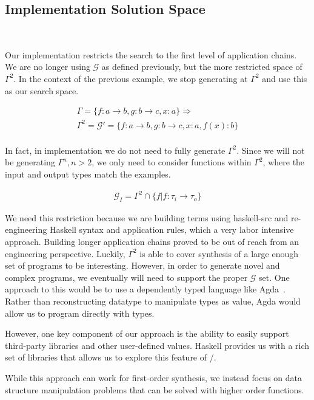 \subsection{Implementation Solution Space}\label{solnSpace}\

Our implementation restricts the search to the first level of application chains.
We are no longer using $\mathcal{G}$ as defined previously, but the more restricted space of $\Gamma^2$.
In the context of the previous example, we stop generating at $\Gamma^2$ and use this as our search space.

\begin{gather*}
\Gamma = \{f:a\to b, g:b\to c, x:a\} \Rightarrow \\
\Gamma^2 = \mathcal{G}' = \{f:a\to b, g:b\to c, x:a, f(x):b\}\\
\end{gather*}

In fact, in implementation we do not need to fully generate $\Gamma^2$.
Since we will not be generating $\Gamma^n, n>2$, we only need to consider functions within $\Gamma^2$, where the input and output types match the examples.

\begin{gather*}
\mathcal{G}_I = \Gamma^2 \cap \{f | f : \tau_i \to \tau_o\}
\end{gather*}

We need this restriction because we are building terms using haskell-src and re-engineering Haskell syntax and application rules, which a very labor intensive approach.
Building longer application chains proved to be out of reach from an engineering perspective.
Luckily, $\Gamma^2$ is able to cover synthesis of a large enough set of programs to be interesting.
However, in order to generate novel and complex programs, we eventually will need to support the proper $\mathcal{G}$ set.
One approach to this would be to use a dependently typed language like Agda~\cite{}.
Rather than reconstructing datatype to manipulate types as value, Agda would allow us to program directly with types.

However, one key component of our approach is the ability to easily support third-party libraries and other user-defined values.
Haskell provides us with a rich set of libraries that allows us to explore this feature of \ourTool/.

While this approach can work for first-order synthesis, we instead focus on data structure manipulation problems that can be solved with higher order functions.

